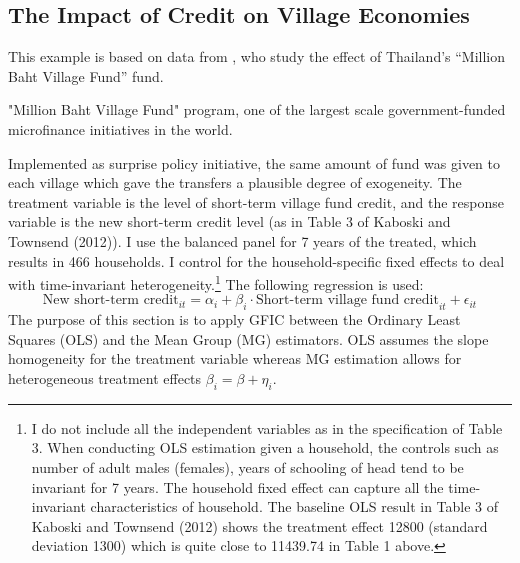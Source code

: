 \subsection{The Impact of Credit on Village Economies}
\label{sec:townsend}
This example is based on data from \cite{Townsend}, who study the effect of Thailand's ``Million Baht Village Fund'' fund. 

"Million Baht Village Fund" program, one of the largest scale government-funded microfinance initiatives in the world. 

Implemented as surprise policy initiative, the same amount of fund was given to each village which gave the transfers a plausible degree of exogeneity.
The treatment variable is the level of short-term village fund credit, and the response variable is the new short-term credit level (as in Table 3 of Kaboski and Townsend (2012)). 
I use the balanced panel for 7 years of the treated, which results in 466 households. 
I control for the household-specific fixed effects to deal with time-invariant heterogeneity.\footnote{I do not include all the independent variables as in the specification of Table 3. When conducting OLS estimation given a household, the controls such as number of adult males (females), years of schooling of head tend to be invariant for 7 years. The household fixed effect can capture all the time-invariant characteristics of household. The baseline OLS result in Table 3 of Kaboski and Townsend (2012) shows the treatment effect 12800 (standard deviation 1300) which is quite close to 11439.74 in Table 1 above.} 
The following regression is used:    
\[
\text{New short-term credit}_{it} = \alpha_i + \beta_i \cdot \text{Short-term village fund credit}_{it} + \epsilon_{it}
\]
The purpose of this section is to apply GFIC between the Ordinary Least Squares (OLS) and the Mean Group (MG) estimators. 
OLS assumes the slope homogeneity for the treatment variable whereas MG estimation allows for heterogeneous treatment effects $\beta_i = \beta + \eta_i$.  
    

